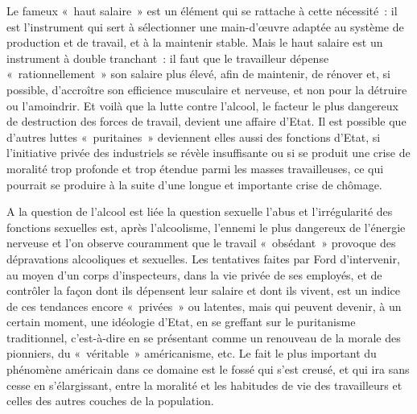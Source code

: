 \documentclass[french,twoside]{book} %
\begin{document}
Le fameux « haut salaire » est un élément qui se rattache à cette nécessité : il est l’instrument qui sert à sélectionner une main-d’œuvre adaptée au système de production et de travail, et à la maintenir stable. Mais le haut salaire est un instrument à double tranchant : il faut que le travailleur dépense « rationnellement » son salaire plus élevé, afin de maintenir, de rénover et, si possible, d’accroître son efficience musculaire et nerveuse, et non pour la détruire ou l’amoindrir. Et voilà que la lutte contre l’alcool, le facteur le plus dangereux de destruction des forces de travail, devient une affaire d’Etat. Il est possible que d’autres luttes « puritaines » deviennent elles aussi des fonctions d’Etat, si l’initiative privée des industriels se révèle insuffisante ou si se produit une crise de moralité trop profonde et trop étendue parmi les masses travailleuses, ce qui pourrait se produire à la suite d’une longue et importante crise de chômage.\par
A la question de l’alcool est liée la question sexuelle l’abus et l’irrégularité des fonctions sexuelles est, après l’alcoolisme, l’ennemi le plus dangereux de l’énergie nerveuse et l’on observe couramment que le travail « obsédant » provoque des dépravations alcooliques et sexuelles. Les tentatives faites par Ford d’intervenir, au moyen d’un corps d’inspecteurs, dans la vie privée de ses employés, et de contrôler la façon dont ils dépensent leur salaire et dont ils vivent, est un indice de ces tendances encore « privées » ou latentes, mais qui peuvent devenir, à un certain moment, une idéologie d’Etat, en se greffant sur le puritanisme traditionnel, c’est-à-dire en se présentant comme un renouveau de la morale des pionniers, du « véritable » américanisme, etc. Le fait le plus important du phénomène américain dans ce domaine est le fossé qui s’est creusé, et qui ira sans cesse en s’élargissant, entre la moralité et les habitudes de vie des travailleurs et celles des autres couches de la population.\par
\end{document}
